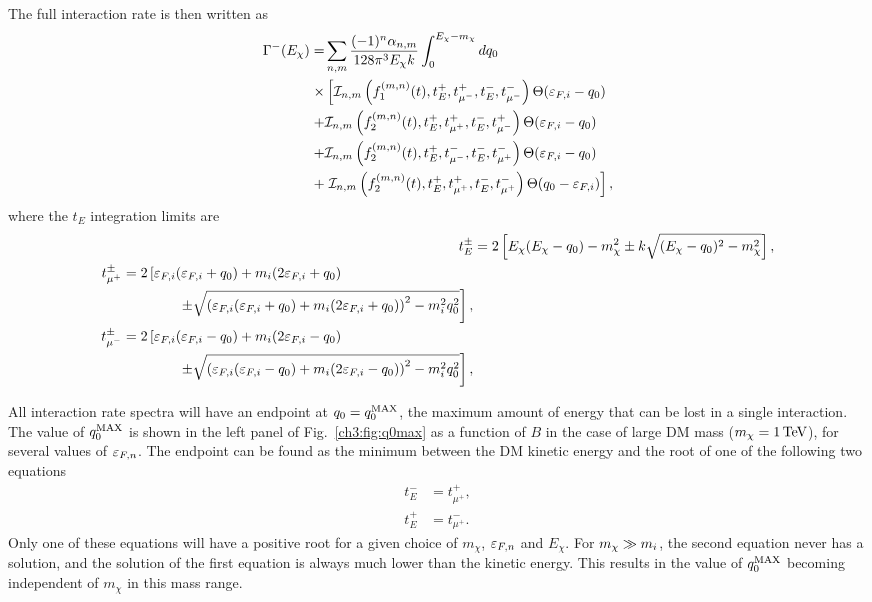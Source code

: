 The full interaction rate is then written as
\begin{align}
    \begin{split}
        \Gamma^{-}(E_\chi)  =& \sum_{n,m}  \frac{(-1)^n \alpha_{n,m}}{128\pi^3 E_\chi k }\int_0^{E_\chi -m_\chi} dq_0  \\
         \times & \left[ \mathcal{I}_{n,m}\left(f_1^{(m,n)}(t),t_E^+,t_{\mu^-}^+,t_E^-,t_{\mu^-}^-\right)\Theta(\varepsilon_{F,i}-q_0)\right.\\
        + & \mathcal{I}_{n,m}\left(f_2^{(m,n)}(t),t_E^+,t_{\mu^+}^+,t_E^-,t_{\mu^-}^+\right)\Theta(\varepsilon_{F,i}-q_0) \\
        + & \mathcal{I}_{n,m}\left(f_2^{(m,n)}(t),t_E^+,t_{\mu^-}^-,t_E^-,t_{\mu^+}^-\right)\Theta(\varepsilon_{F,i}-q_0) \\
        + & \left. \mathcal{I}_{n,m}\left(f_2^{(m,n)}(t),t_E^+,t_{\mu^+}^+,t_E^-,t_{\mu^+}^-\right)\Theta(q_0-\varepsilon_{F,i}) \right], \label{app:eq:gammafull_app}
    \end{split}
\end{align}
where the $t_E$ integration limits are
\begin{align}
 t_E^\pm &= 2\left[E_\chi(E_\chi-q_0)-m_\chi^2\pm k\sqrt{(E_\chi-q_0)^2-m_\chi^2}\right],\\
 \begin{split}
    t_{\mu^{+}}^\pm &= 2\left[\varepsilon_{F,i}(\varepsilon_{F,i}+q_0)+m_i(2\varepsilon_{F,i}+q_0) \right. \\
    &\hspace{4em}\left.\pm \sqrt{\left(\varepsilon_{F,i}(\varepsilon_{F,i}+q_0)+m_i(2\varepsilon_{F,i}+q_0)\right)^2-m_i^2q_0^2}\right],
 \end{split}\\
 \begin{split}
    t_{\mu^{-}}^\pm &=  2\left[\varepsilon_{F,i}(\varepsilon_{F,i}-q_0)+m_i(2\varepsilon_{F,i}-q_0)\right.\\
    &\hspace{4em}\left.\pm\sqrt{\left(\varepsilon_{F,i}(\varepsilon_{F,i}-q_0)+m_i(2\varepsilon_{F,i}-q_0)\right)^2-m_i^2q_0^2}\right], 
 \end{split}
\end{align}

All interaction rate spectra will have an endpoint at $q_0 = q_0^{\rm MAX}$, the maximum amount of energy that can be lost in a single interaction.
The value of $q_0^{\rm MAX}$ is shown in the left panel of Fig.~\ref{ch3:fig:q0max} as a function of $B$ in the case of large DM mass ($m_\chi = 1{\rm \,TeV}$), for several values of $\varepsilon_{F,n}$. The endpoint can be found as the minimum between the DM kinetic energy and the root of one of the following two equations 
\begin{align}
    t_E^- &= t_{\mu^+}^+,\\
    t_E^+ &= t_{\mu^+}^-.
\end{align}
Only one of these equations will have a positive root for a given choice of $m_\chi$, $\varepsilon_{F,n}$ and $E_\chi$.
For $m_\chi\gg m_i$, the second equation never has a solution, and the solution of the first equation is always much lower than the kinetic energy. This results in the value of $q_0^{\rm MAX}$ becoming independent of $m_\chi$ in this mass range.


